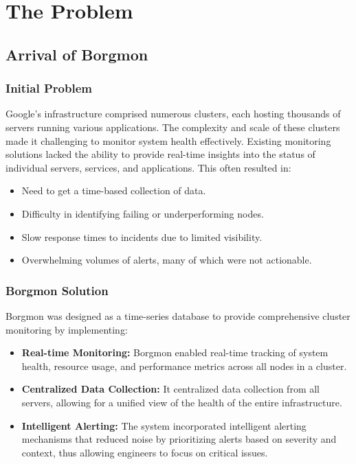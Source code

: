 \chapter{The Problem}

\label{Chapter2} %


\section{Arrival of Borgmon}

\subsection{Initial Problem}
Google's infrastructure comprised numerous clusters, each hosting thousands of servers running various applications. The complexity and scale of these clusters made it challenging to monitor system health effectively. Existing monitoring solutions lacked the ability to provide real-time insights into the status of individual servers, services, and applications. This often resulted in:
\begin{itemize}
    \item Need to get a time-based collection of data.
    \item Difficulty in identifying failing or underperforming nodes.
    \item Slow response times to incidents due to limited visibility.
    \item Overwhelming volumes of alerts, many of which were not actionable.
\end{itemize}

\subsection{Borgmon Solution\cite{Borgmon}}
Borgmon was designed as a time-series database to provide comprehensive cluster monitoring by implementing:
\begin{itemize}
    \item \textbf{Real-time Monitoring:} Borgmon enabled real-time tracking of system health, resource usage, and performance metrics across all nodes in a cluster.
    \item \textbf{Centralized Data Collection:} It centralized data collection from all servers, allowing for a unified view of the health of the entire infrastructure.
    \item \textbf{Intelligent Alerting:} The system incorporated intelligent alerting mechanisms that reduced noise by prioritizing alerts based on severity and context, thus allowing engineers to focus on critical issues.
\end{itemize}

